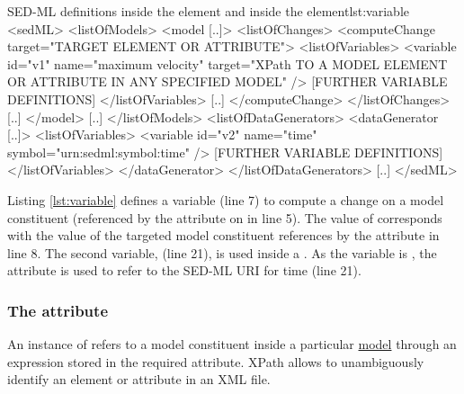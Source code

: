 %
%
\begin{myXmlLst}{SED-ML  definitions inside the  element and inside the  element}{lst:variable}
<sedML>
 <listOfModels>
  <model [..]>
   <listOfChanges>
    <computeChange target="TARGET ELEMENT OR ATTRIBUTE">
     <listOfVariables>
       <variable id="v1" name="maximum velocity" 
        target="XPath TO A MODEL ELEMENT OR ATTRIBUTE IN ANY SPECIFIED MODEL" />
      [FURTHER VARIABLE DEFINITIONS]
     </listOfVariables>
     [..]
    </computeChange>
   </listOfChanges>
   [..]
  </model>
  [..]
 </listOfModels>
 <listOfDataGenerators>
  <dataGenerator [..]>
   <listOfVariables>
    <variable id="v2" name="time" symbol="urn:sedml:symbol:time" />
      [FURTHER VARIABLE DEFINITIONS]
   </listOfVariables>
  </dataGenerator>
 </listOfDataGenerators>
 [..]
</sedML>
\end{myXmlLst}
%
Listing \ref{lst:variable} defines a variable  (line 7) to compute a change on a model constituent (referenced by the  attribute on  in line 5). The value of  corresponds with the value of the targeted model constituent references by the  attribute in line 8. 
The second variable,  (line 21), is used inside a . As the variable is , the  attribute is used to refer to the SED-ML URI for time (line 21).

\subsubsection{The  attribute}
\label{sec:target}
An instance of  refers to a model constituent inside a particular \hyperref[class:model]{model} through an  expression stored in the required  attribute. 
%
XPath allows to unambiguously identify an element or attribute in an XML file.

